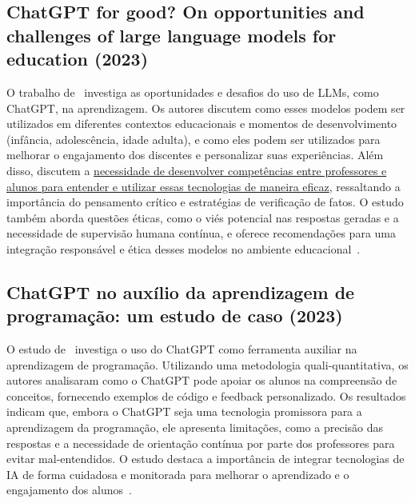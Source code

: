\documentclass[journal]{IEEEtran}
\begin{document}
\subsection{ChatGPT for good? On opportunities and challenges of large language models for education (2023)}
\noindent%
O trabalho de~\cite{kasneci2023chatgpt} investiga as oportunidades e desafios do uso de LLMs, como ChatGPT, na aprendizagem.
Os autores discutem como esses modelos podem ser utilizados em diferentes contextos educacionais e momentos de desenvolvimento (infância, adolescência, idade adulta), e como eles podem ser utilizados para melhorar o engajamento dos discentes e personalizar suas experiências.
Além disso, discutem a \ul{necessidade de desenvolver competências entre professores e alunos para entender e utilizar essas tecnologias de maneira eficaz}, ressaltando a importância do pensamento crítico e estratégias de verificação de fatos.
O estudo também aborda questões éticas, como o viés potencial nas respostas geradas e a necessidade de supervisão humana contínua, e oferece recomendações para uma integração responsável e ética desses modelos no ambiente educacional~\cite{kasneci2023chatgpt}.

\subsection{ChatGPT no auxílio da aprendizagem de programação: um estudo de caso (2023)}
\noindent%
O estudo de~\cite{da2023chatgpt} investiga o uso do ChatGPT como ferramenta auxiliar na aprendizagem de programação.
Utilizando uma metodologia quali-quantitativa, os autores analisaram como o ChatGPT pode apoiar os alunos na compreensão de conceitos, fornecendo exemplos de código e feedback personalizado.
Os resultados indicam que, embora o ChatGPT seja uma tecnologia promissora para a aprendizagem da programação, ele apresenta limitações, como a precisão das respostas e a necessidade de orientação contínua por parte dos professores para evitar mal-entendidos.
O estudo destaca a importância de integrar tecnologias de IA de forma cuidadosa e monitorada para melhorar o aprendizado e o engajamento dos alunos~\cite{da2023chatgpt}.
\end{document}

